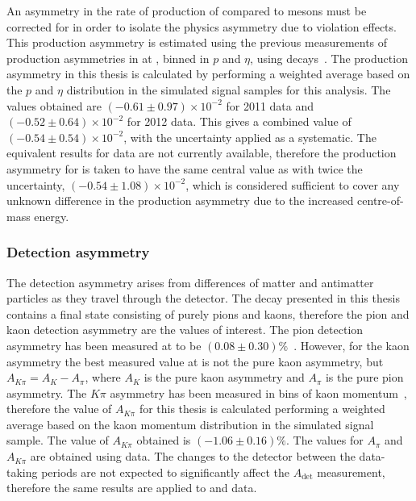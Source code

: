An asymmetry in the rate of production of \Bp compared to \Bm mesons must be corrected for in order to isolate the physics asymmetry due to \CP violation effects. This \Bpm production asymmetry is estimated using the previous measurements of production asymmetries in \runone at \lhcb, binned in $p$ and $\eta$, using \decay{\Bp}{\Dzb\pip} decays~\cite{LHCb-PAPER-2016-054}. The production asymmetry in this thesis is calculated by performing a weighted average based on the $p$ and $\eta$ distribution in the simulated signal samples for this analysis. The values obtained are $(-0.61 \pm 0.97) \times 10^{-2}$ for 2011 data and $(-0.52 \pm 0.64) \times 10^{-2}$ for 2012 data. This gives a combined \runone value of $(-0.54 \pm 0.54) \times 10^{-2}$, with the uncertainty applied as a systematic. The equivalent results for \runtwo data are not currently available, therefore the production asymmetry for \runtwo is taken to have the same central value as \runone with twice the uncertainty, $(-0.54 \pm 1.08) \times 10^{-2}$, which is considered sufficient to cover any unknown difference in the production asymmetry due to the increased centre-of-mass energy. 

\subsubsection{Detection asymmetry}

The detection asymmetry arises from differences of matter and antimatter particles as they travel through the detector. The \btodkst decay presented in this thesis contains a final state consisting of purely pions and kaons, therefore the pion and kaon detection asymmetry are the values of interest. The pion detection asymmetry has been measured at \lhcb to be $(0.08 \pm 0.30)\%$~\cite{pi_det_asym}. However, for the kaon asymmetry the best measured value at \lhcb is not the pure kaon asymmetry, but $A_{K\pi} = A_K - A_{\pi}$, where $A_K$ is the pure kaon asymmetry and $A_{\pi}$ is the pure pion asymmetry. The $K\pi$ asymmetry has been measured in bins of kaon momentum~\cite{k_det_asym}, therefore the value of $A_{K\pi}$ for this thesis is calculated performing a weighted average based on the kaon momentum distribution in the simulated signal sample. The value of $A_{K\pi}$ obtained is $(-1.06 \pm 0.16)\%$. The values for $A_{\pi}$ and $A_{K\pi}$ are obtained using \runone data. The changes to the detector between the data-taking periods are not expected to significantly affect the $A_{\text{det}}$ measurement, therefore the same results are applied to \runone and \runtwo data. 

